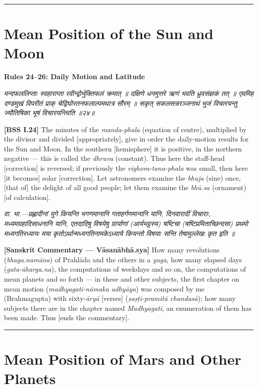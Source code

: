 \documentclass[11pt,a4paper]{book}
\newcommand{\dev}[1]{{\devanagarifont #1}}
\newcommand{\shlokabilingual}[2]{%
  \par\vspace{0.8em}%
  \noindent\begin{minipage}[t]{0.48\textwidth}
    \RaggedRight
    \dev{\textit{#1}}
  \end{minipage}%
  \hfill
  \begin{minipage}[t]{0.48\textwidth}
    \RaggedRight
    #2%
  \end{minipage}%
  \par\vspace{0.8em}%
}
\newcommand{\sktcommbilingual}[2]{%
  \par\vspace{0.5em}%
  \noindent\begin{minipage}[t]{0.48\textwidth}
    \RaggedRight\small\itshape
    \dev{#1}
  \end{minipage}%
  \hfill
  \begin{minipage}[t]{0.48\textwidth}
    \RaggedRight\small
    #2%
  \end{minipage}%
  \par\vspace{0.5em}%
}
\newcommand{\ruleheadingbilingual}[2]{%
  \par\vspace{0.8em}%
  \noindent\begin{minipage}[t]{0.48\textwidth}
    \textbf{\color{sectioncolor}\dev{#1}}
  \end{minipage}%
  \hfill
  \begin{minipage}[t]{0.48\textwidth}
    \textbf{\color{sectioncolor}#2}
  \end{minipage}%
  \par\vspace{0.4em}%
}
\newcommand{\secdivider}{%
  \begin{center}\rule{0.4\textwidth}{0.5pt}\end{center}%
}
\begin{document}
\secdivider
\clearpage

\section{Mean Position of the Sun and Moon}

\ruleheadingbilingual{नियमाः २४--२६}{Rules 24--26: Daily Motion and Latitude}

\shlokabilingual{%
मन्दफललिप्ताः स्वहाराप्ता रवीन्द्वोर्भुक्तिफलं क्रमात्‌ ॥
दक्षिणे धनमुत्तरे ऋणं भवति ध्रुवसंज्ञकं तत्‌ ॥
एवमिह दण्डमुखं विपरीतं प्राक्‌ चेद्विघोरतनफलाल्पमथात्र सौरम्‌ ॥
सकृत्‌ सकलसन्नरञ्जनाथं भुजं विचारयन्तु ज्यौतिषिका भूषं विचारयन्त्विति ॥२४॥
}{%
\textbf{[BSS I.24]} The minutes of the \textit{manda-phala} (equation of centre), multiplied by the divisor and divided [appropriately], give in order the daily-motion results for the Sun and Moon. In the southern [hemisphere] it is positive, in the northern negative --- this is called the \textit{dhruva} (constant). Thus here the staff-head [correction] is reversed; if previously the \textit{vighora-tana-phala} was small, then here [it becomes] solar [correction]. Let astronomers examine the \textit{bhuja} (sine) once, [that of] the delight of all good people; let them examine the \textit{bhū.sa} (ornament) [of calculation].
}

\sktcommbilingual{%
\dev{वा. भा.}---प्रह्लादीनां युगे कियन्ति भगणमानानि गताहर्गणमानानि यानि, दिनवारादीं विचाराः, मध्यमग्रहादिसाधनानि यानि, एतदादिषु विषयेषु ग्रार्याणां (आर्यभट्टस्य) षष्टिचा (षष्टिप्रमिताच्छिन्दसा) प्रथमो मध्यगतिरध्यायः मया कृतोऽर्थान्मध्यगतिनामकेऽध्याये कियन्तो विषयाः सन्ति तेषामुल्लेखः कृत इति ॥
}{%
\textbf{[Sanskrit Commentary --- Vāsanābhā.sya]} How many revolutions (\textit{bhaga.namāna}) of Prahlāda and the others in a \textit{yuga}, how many elapsed days (\textit{gata-āharga.na}), the computations of weekdays and so on, the computations of mean planets and so forth --- in these and other subjects, the first chapter on mean motion (\textit{madhyagati-nāmaka adhyāya}) was composed by me (Brahmagupta) with sixty-\textit{āryā} [verses] (\textit{ṣaṣṭi-pramitā chandasā}); how many subjects there are in the chapter named \textit{Madhyagati}, an enumeration of them has been made. Thus [ends the commentary].
}

\secdivider
\clearpage

\section{Mean Position of Mars and Other Planets}
\end{document}
